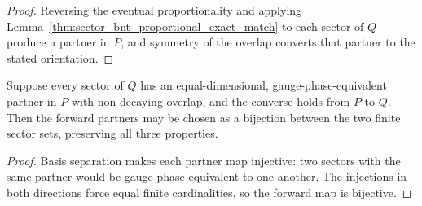 \begin{proof}\leanok
    Reversing the eventual proportionality and applying
    Lemma~\ref{thm:sector_bnt_proportional_exact_match} to each sector of
    $Q$ produce a partner in $P$, and symmetry of the overlap converts that
    partner to the stated orientation.
\end{proof}

\begin{lemma}
    \label{lem:sector_bnt_bijection_from_matches}
    \leanok
    Suppose every sector of $Q$ has an equal-dimensional,
    gauge-phase-equivalent partner in $P$ with non-decaying overlap, and the
    converse holds from $P$ to $Q$. Then the forward partners may be chosen as
    a bijection between the two finite sector sets, preserving all three
    properties.
\end{lemma}

\begin{proof}\leanok
    Basis separation makes each partner map injective: two sectors with the
    same partner would be gauge-phase equivalent to one another. The injections
    in both directions force equal finite cardinalities, so the forward map is
    bijective.
\end{proof}
